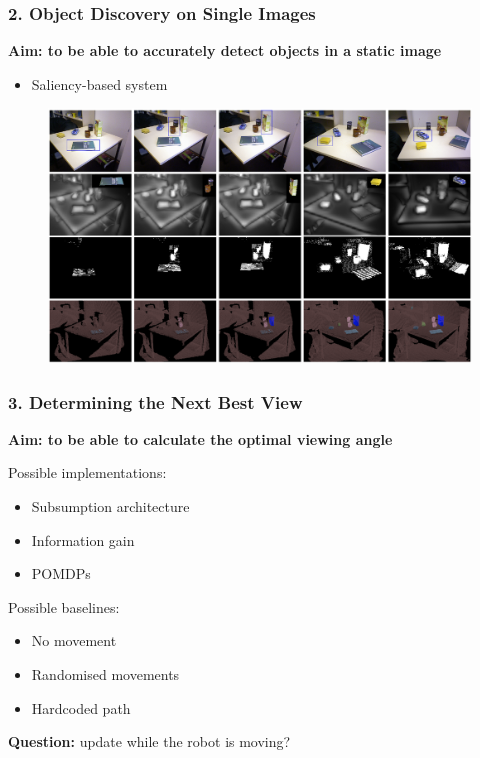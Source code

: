 \begin{frame}[t] \frametitle{2. Object Discovery on Single Images}

	\textbf{Aim: to be able to accurately detect objects in a static image}

	\vfill

	\begin{itemize}
		\item Saliency-based system \cite{garcia2013computational}
	\end{itemize}

	\vfill

	\centering

	\begin{figure}
	\includegraphics[width=0.8\linewidth]{src/garcia2013fig4.png}
	\end{figure}

\end{frame}


\begin{frame}[t] \frametitle{3. Determining the Next Best View}

	\textbf{Aim: to be able to calculate the optimal viewing angle}

	\onslide<+->
	{

	Possible implementations:

	\begin{itemize}
		\item Subsumption architecture \cite{brooks1986robust}
		\item Information gain \cite{surmann2003autonomous}
		\item POMDPs \cite{lauri2015planning}
	\end{itemize}

	}

	\onslide<+->
	{

	Possible baselines:

	\begin{itemize}
		\item No movement
		\item Randomised movements
		\item Hardcoded path
	\end{itemize}

	}

	\vfill

	\onslide<+->
	{
	\textbf{Question:} update while the robot is moving?
	}

\end{frame}


